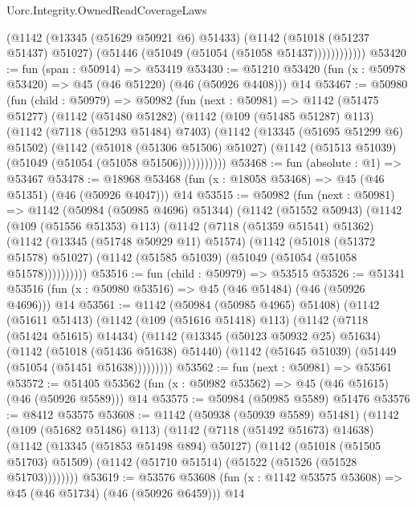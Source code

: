 \begin{lexlean}{Uorc.Integrity.OwnedReadCoverageLaws}
\begin{coremodule}
                (@1142
                  (@13345 (@51629 @50921 @6) @51433)
                  (@1142
                    (@51018 (@51237 @51437) @51027)
                    (@51446 (@51049 (@51054 (@51058 @51437))))))))))))
@53420 := fun (span : @50914) => @53419
@53430 := @51210 @53420 (fun (x : @50978 @53420) => @45 (@46 @51220) (@46 (@50926 @4408))) @14
@53467 := @50980
    (fun (child : @50979) =>
    @50982
      (fun (next : @50981) =>
      @1142
        (@51475 @51277)
        (@1142
          (@51480 @51282)
          (@1142
            (@109 (@51485 @51287) @113)
            (@1142
              (@7118 (@51293 @51484) @7403)
              (@1142
                (@13345 (@51695 @51299 @6) @51502)
                (@1142
                  (@51018 (@51306 @51506) @51027)
                  (@1142 (@51513 @51039) (@51049 (@51054 (@51058 @51506)))))))))))
@53468 := fun (absolute : @1) => @53467
@53478 := @18968 @53468 (fun (x : @18058 @53468) => @45 (@46 @51351) (@46 (@50926 @4047))) @14
@53515 := @50982
    (fun (next : @50981) =>
    @1142
      (@50984 (@50985 @4696) @51344)
      (@1142
        (@51552 @50943)
        (@1142
          (@109 (@51556 @51353) @113)
          (@1142
            (@7118 (@51359 @51541) @51362)
            (@1142
              (@13345 (@51748 @50929 @11) @51574)
              (@1142
                (@51018 (@51372 @51578) @51027)
                (@1142 (@51585 @51039) (@51049 (@51054 (@51058 @51578))))))))))
@53516 := fun (child : @50979) => @53515
@53526 := @51341 @53516 (fun (x : @50980 @53516) => @45 (@46 @51484) (@46 (@50926 @4696))) @14
@53561 := @1142
    (@50984 (@50985 @4965) @51408)
    (@1142
      (@51611 @51413)
      (@1142
        (@109 (@51616 @51418) @113)
        (@1142
          (@7118 (@51424 @51615) @14434)
          (@1142
            (@13345 (@50123 @50932 @25) @51634)
            (@1142
              (@51018 (@51436 @51638) @51440)
              (@1142 (@51645 @51039) (@51449 (@51054 (@51451 @51638)))))))))
@53562 := fun (next : @50981) => @53561
@53572 := @51405 @53562 (fun (x : @50982 @53562) => @45 (@46 @51615) (@46 (@50926 @5589))) @14
@53575 := @50984 (@50985 @5589) @51476
@53576 := @8412 @53575
@53608 := @1142
    (@50938 (@50939 @5589) @51481)
    (@1142
      (@109 (@51682 @51486) @113)
      (@1142
        (@7118 (@51492 @51673) @14638)
        (@1142
          (@13345 (@51853 @51498 @894) @50127)
          (@1142
            (@51018 (@51505 @51703) @51509)
            (@1142 (@51710 @51514) (@51522 (@51526 (@51528 @51703))))))))
@53619 := @53576 @53608 (fun (x : @1142 @53575 @53608) => @45 (@46 @51734) (@46 (@50926 @6459))) @14

\end{coremodule}
\end{lexlean}
